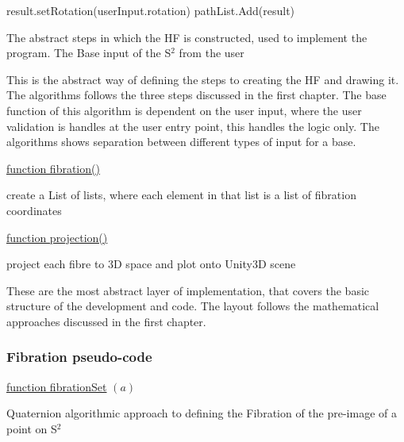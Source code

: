 \documentclass[12pt]{article} %
\begin{document}
\begin{flushleft}
\begin{algorithm}[H]
{{{}
}{
}
result.setRotation(userInput.rotation)\;
pathList.Add(result)
}
\caption{The abstract steps in which the HF is constructed, used to implement the program. The Base input of the S$^{2}$ from the user}
\end{algorithm}
This is the abstract way of defining the steps to creating the HF and drawing it. The algorithms follows the three steps discussed in the first chapter. The base function of this algorithm is dependent on the user input, where the user validation is handles at the user entry point, this handles the logic only. The algorithms shows separation between different types of input for a base.
\begin{algorithm}[H]
\underline{function fibration()}\;
    \caption{create a List of lists, where each element in that list is a list of fibration coordinates}
\end{algorithm}

\begin{algorithm}[H]
\underline{function projection()}\;
    \caption{project each fibre to 3D space and plot onto Unity3D scene}
\end{algorithm}
These are the most abstract layer of implementation, that covers the basic structure of the development and code. The layout follows the mathematical approaches discussed in the first chapter.
\subsubsection{Fibration pseudo-code} %
\begin{algorithm}[H]

    \underline{function fibrationSet} $(a)$\;
    \caption{Quaternion algorithmic approach to defining the Fibration of the pre-image of a point on S$^{2}$}
\end{algorithm}


\end{flushleft}
\end{document}

